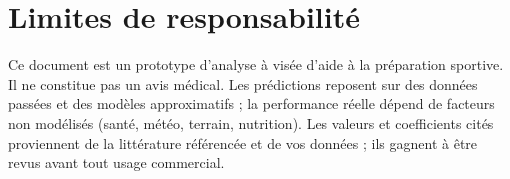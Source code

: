 \documentclass{locomotionreport}
\begin{document}
\section*{Limites de responsabilit\'e}
Ce document est un prototype d'analyse \`a vis\'ee d'aide \`a la pr\'eparation sportive. Il ne constitue pas un avis
m\'edical. Les pr\'edictions reposent sur des donn\'ees pass\'ees et des mod\`eles approximatifs ; la performance r\'eelle
d\'epend de facteurs non mod\'elis\'es (sant\'e, m\'et\'eo, terrain, nutrition). Les valeurs et coefficients cit\'es
proviennent de la litt\'erature r\'ef\'erenc\'ee et de vos donn\'ees ; ils gagnent \`a \^etre revus avant tout usage
commercial.

\printbibliography
\end{document}
